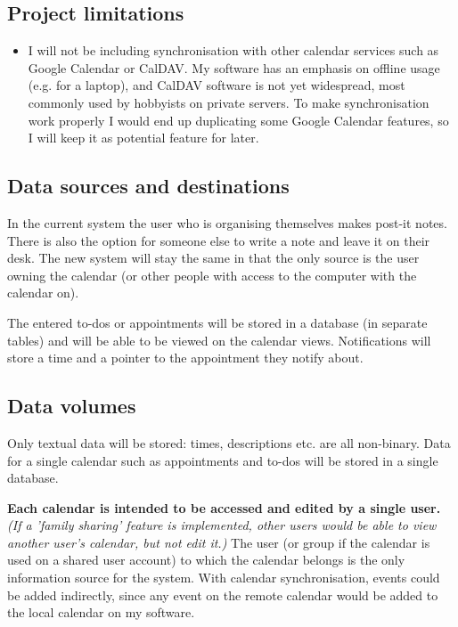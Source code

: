 \subsection{Project limitations}
\begin{itemize}
    \item I will not be including synchronisation with other calendar services
          such as Google Calendar or CalDAV. My software has an emphasis
          on offline usage (e.g. for a laptop), and CalDAV software is not yet
          widespread, most commonly used by hobbyists on private servers. To
          make synchronisation work properly I would end up duplicating some
          Google Calendar features, so I will keep it as potential feature for
          later.
\end{itemize}


\subsection{Data sources and destinations}

In the current system the user who is organising themselves makes post-it notes.
There is also the option for someone else to write a note and leave it on their
desk. The new system will stay the same in that the only source is the user
owning the calendar (or other people with access to the computer with the
calendar on).

The entered to-dos or appointments will be stored in a database (in separate
tables) and will be able to be viewed on the calendar views. Notifications will
store a time and a pointer to the appointment they notify about.


\subsection{Data volumes}

Only textual data will be stored: times, descriptions etc. are all
non-binary. Data for a single calendar such as appointments and to-dos will be
stored in a single database.

\textbf{Each calendar is intended to be accessed and edited by a single user.}
\textit{(If a 'family sharing' feature is implemented, other users would be able
to view another user's calendar, but not edit it.)} The user (or group if the
calendar is used on a shared user account) to which the calendar belongs is the
only information source for the system. With calendar synchronisation, events
could be added indirectly, since any event on the remote calendar would be added
to the local calendar on my software.

